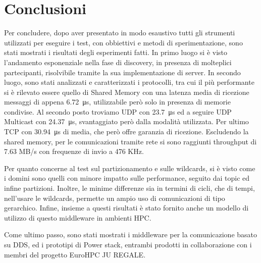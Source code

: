 \chapter{Conclusioni}
Per concludere, dopo aver presentato in modo esaustivo tutti gli strumenti utilizzati per eseguire i test, con obbiettivi e metodi di sperimentazione, sono stati mostrati i risultati degli esperimenti fatti. 
In primo luogo si è visto l'andamento esponenziale nella fase di discovery, in presenza di molteplici partecipanti, risolvibile tramite la sua implementazione di server.
In secondo luogo, sono stati analizzati e caratterizzati i protocolli, tra cui il più performante si è rilevato essere quello di Shared Memory con una latenza media di ricezione messaggi di appena \SI{6.72}{\micro\second}, utilizzabile però solo in presenza di memorie condivise.
Al secondo posto troviamo UDP con \SI{23.7}{\micro\second} ed a seguire UDP Multicast con \SI{24.37}{\micro\second}, svantaggiato però dalla modalità utilizzata. Per ultimo TCP con \SI{30.94}{\micro\second} di media, che però offre garanzia di ricezione. Escludendo la shared memory, per le comunicazioni tramite rete si sono raggiunti throughput di 7.63 MB/s con frequenze di invio a 476 KHz.

Per quanto concerne al test sul partizionamento e sulle wildcards, si è visto come i domini sono quelli con minore impatto sulle performance, seguito dai topic ed infine partizioni. Inoltre, le minime differenze sia in termini di cicli, che di tempi, nell'usare le wildcards, permette un ampio uso di comunicazioni di tipo gerarchico.
Infine, insieme a questi risultati è stato fornito anche un modello di utilizzo di questo middleware in ambienti HPC.

Come ultimo passo, sono stati mostrati i middleware per la comunicazione basato su DDS, ed i prototipi di Power stack, entrambi prodotti in collaborazione con i membri del progetto EuroHPC JU REGALE.

